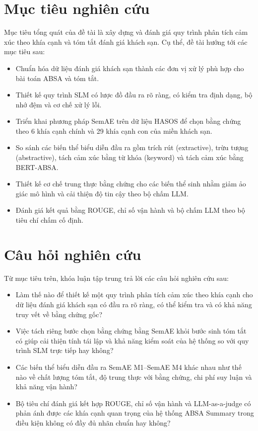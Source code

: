 \section{Mục tiêu nghiên cứu}

Mục tiêu tổng quát của đề tài là xây dựng và đánh giá quy trình phân tích cảm xúc theo khía cạnh và tóm tắt đánh giá khách sạn. Cụ thể, đề tài hướng tới các mục tiêu sau:

\begin{itemize}[leftmargin=1.2cm]
    \item Chuẩn hóa dữ liệu đánh giá khách sạn thành các đơn vị xử lý phù hợp cho bài toán ABSA và tóm tắt.
    \item Thiết kế quy trình SLM có lược đồ đầu ra rõ ràng, có kiểm tra định dạng, bộ nhớ đệm và cơ chế xử lý lỗi.
    \item Triển khai phương pháp SemAE trên dữ liệu HASOS để chọn bằng chứng theo 6 khía cạnh chính và 29 khía cạnh con của miền khách sạn.
    \item So sánh các biến thể biểu diễn đầu ra gồm trích rút (extractive), trừu tượng (abstractive), tách cảm xúc bằng từ khóa (keyword) và tách cảm xúc bằng BERT-ABSA.
    \item Thiết kế cơ chế trung thực bằng chứng cho các biến thể sinh nhằm giảm ảo giác mô hình và cải thiện độ tin cậy theo bộ chấm LLM.
    \item Đánh giá kết quả bằng ROUGE, chỉ số vận hành và bộ chấm LLM theo bộ tiêu chí chấm cố định.
\end{itemize}

\section{Câu hỏi nghiên cứu}

Từ mục tiêu trên, khóa luận tập trung trả lời các câu hỏi nghiên cứu sau:

\begin{itemize}[leftmargin=1.2cm]
    \item Làm thế nào để thiết kế một quy trình phân tích cảm xúc theo khía cạnh cho dữ liệu đánh giá khách sạn có đầu ra rõ ràng, có thể kiểm tra và có khả năng truy vết về bằng chứng gốc?
    \item Việc tách riêng bước chọn bằng chứng bằng SemAE khỏi bước sinh tóm tắt có giúp cải thiện tính tái lập và khả năng kiểm soát của hệ thống so với quy trình SLM trực tiếp hay không?
    \item Các biến thể biểu diễn đầu ra SemAE M1--SemAE M4 khác nhau như thế nào về chất lượng tóm tắt, độ trung thực với bằng chứng, chi phí suy luận và khả năng vận hành?
    \item Bộ tiêu chí đánh giá kết hợp ROUGE, chỉ số vận hành và LLM-as-a-judge có phản ánh được các khía cạnh quan trọng của hệ thống ABSA Summary trong điều kiện không có đầy đủ nhãn chuẩn hay không?
\end{itemize}

